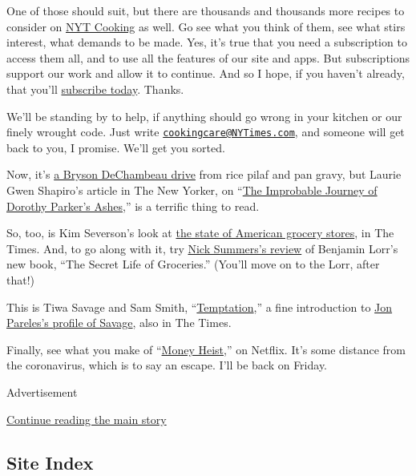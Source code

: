 One of those should suit, but there are thousands and thousands more
recipes to consider on
\href{https://cooking.nytimes3xbfgragh.onion/}{NYT Cooking} as well. Go
see what you think of them, see what stirs interest, what demands to be
made. Yes, it's true that you need a subscription to access them all,
and to use all the features of our site and apps. But subscriptions
support our work and allow it to continue. And so I hope, if you haven't
already, that you'll
\href{https://www.nytimes3xbfgragh.onion/subscription/cooking.html?campaignId=6XQHR}{subscribe
today}. Thanks.

We'll be standing by to help, if anything should go wrong in your
kitchen or our finely wrought code. Just write
\href{mailto:cookingcare@NYTimes.com}{\nolinkurl{cookingcare@NYTimes.com}},
and someone will get back to you, I promise. We'll get you sorted.

Now, it's \href{https://www.youtube.com/watch?v=ayon1s5ZT2E}{a Bryson
DeChambeau drive} from rice pilaf and pan gravy, but Laurie Gwen
Shapiro's article in The New Yorker, on
``\href{https://www.newyorker.com/culture/culture-desk/the-improbable-journey-of-dorothy-parkers-ashes}{The
Improbable Journey of Dorothy Parker's Ashes},'' is a terrific thing to
read.

So, too, is Kim Severson's look at
\href{https://www.nytimes3xbfgragh.onion/2020/09/08/dining/grocery-shopping-coronavirus.html}{the
state of American grocery stores}, in The Times. And, to go along with
it, try
\href{https://www.nytimes3xbfgragh.onion/2020/09/08/books/review/the-secret-life-of-groceries-benjamin-lorr.html}{Nick
Summers's review} of Benjamin Lorr's new book, ``The Secret Life of
Groceries.'' (You'll move on to the Lorr, after that!)

This is Tiwa Savage and Sam Smith,
``\href{https://youtu.be/Ta-4Fw7woRY}{Temptation},'' a fine introduction
to
\href{https://www.nytimes3xbfgragh.onion/2020/09/07/arts/music/tiwa-savage-celia.html}{Jon
Pareles's profile of Savage}, also in The Times.

Finally, see what you make of
``\href{https://www.netflix.com/title/80192098}{Money Heist},'' on
Netflix. It's some distance from the coronavirus, which is to say an
escape. I'll be back on Friday.

Advertisement

\protect\hyperlink{after-bottom}{Continue reading the main story}

\hypertarget{site-index}{%
\subsection{Site Index}\label{site-index}}

